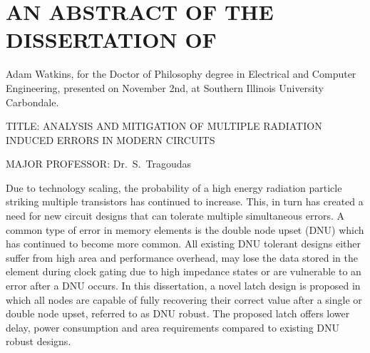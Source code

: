 


\chapter*{AN ABSTRACT OF THE DISSERTATION OF}

Adam Watkins, for the Doctor of Philosophy degree in Electrical and Computer Engineering,
presented on November 2nd, at Southern Illinois University Carbondale.

\vspace{14pt}
\noindent
TITLE: ANALYSIS AND MITIGATION OF MULTIPLE RADIATION INDUCED ERRORS IN MODERN CIRCUITS

\vspace{14pt}

\noindent
MAJOR PROFESSOR: Dr.\ S.\ Tragoudas

\vspace{14pt}

Due to technology scaling, the probability of a high energy radiation particle striking multiple transistors has continued to increase. This, in turn has created a need for new circuit designs that can tolerate multiple simultaneous errors. A common type of error in memory elements is the double node upset (DNU) which has continued to become more common. All existing DNU tolerant designs either suffer from high area and performance overhead, may lose the data stored in the element during clock gating due to high impedance states or are vulnerable to an error after a DNU occurs. In this dissertation, a novel latch design is proposed in which all nodes are capable of fully recovering their correct value after a single or double node upset, referred to as DNU robust. The proposed latch offers lower delay, power consumption and area requirements compared to existing DNU robust designs.

